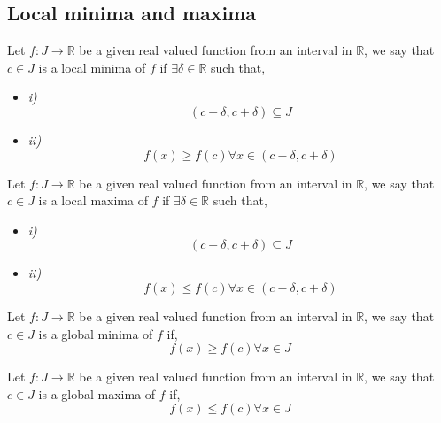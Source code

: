 \documentclass[11pt,a4paper]{colorart}
\def\d{{\delta}}
\def\R{\mathbb{R}}
\def\ra{\rightarrow}
\begin{document}
\subsection{Local minima and maxima}

\begin{definition}
	Let $f:J\ra\R$ be a given real valued function from an interval in $\R$, we say that $c\in J$ is a local minima of $f$ if $\exists \d \in \R$ such that,
	\begin{itemize}
		\item \textit{i)} \[ (c-\d,c+\d) \subseteq J \]
		\item \textit{ii)} \[ f(x) \geq f(c) \forall x \in (c-\d,c+\d) \]
	\end{itemize}
\end{definition}

\begin{definition}
	Let $f:J\ra\R$ be a given real valued function from an interval in $\R$, we say that $c\in J$ is a local maxima of $f$ if $\exists \d \in \R$ such that,
	\begin{itemize}
		\item \textit{i)} \[ (c-\d,c+\d) \subseteq J \]
		\item \textit{ii)} \[ f(x) \leq f(c) \forall x \in (c-\d,c+\d) \]
	\end{itemize}
\end{definition}

\begin{definition}
	Let $f:J\ra\R$ be a given real valued function from an interval in $\R$, we say that $c\in J$ is a global minima of $f$ if,
	\[ f(x) \geq f(c) \forall x \in J \]
\end{definition}

\begin{definition}
	Let $f:J\ra\R$ be a given real valued function from an interval in $\R$, we say that $c\in J$ is a global maxima of $f$ if,
	\[ f(x) \leq f(c) \forall x \in J \]
\end{definition}
\end{document}
